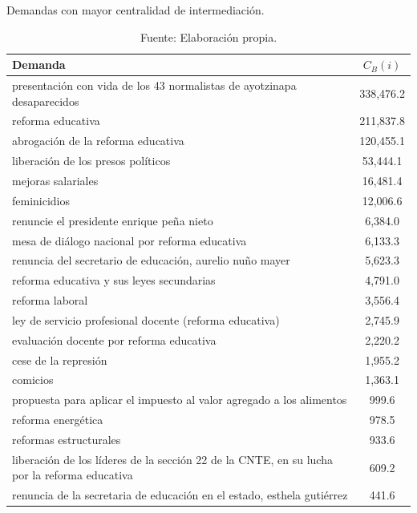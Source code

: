 \documentclass[letterpaper, 11pt]{book}
\theoremstyle{definition}
\theoremstyle{remark}
\begin{document}
\begin{table}[!hbt]
\center
\scriptsize
\caption{Demandas con mayor centralidad de intermediación.}
\label{Demandas_con_mayor_CB}
\begin{tabular}{ | l | c | } 
\hline
\hspace{19em} \textbf{Demanda} & \textbf{$C_{B}(i)$}\\
\hline
[a favor] presentación con vida de los 43 normalistas de ayotzinapa desaparecidos & 338,476.2\\ \hline
[en contra] reforma educativa & 211,837.8\\ \hline
[a favor] abrogación de la reforma educativa & 120,455.1\\ \hline
[a favor] liberación de los presos políticos & 53,444.1\\ \hline
[a favor] mejoras salariales & 16,481.4\\ \hline
[en contra] feminicidios & 12,006.6\\ \hline
[a favor] renuncie el presidente enrique peña nieto & 6,384.0\\ \hline
[a favor] mesa de diálogo nacional por reforma educativa & 6,133.3\\ \hline
[a favor] renuncia del secretario de educación, aurelio nuño mayer & 5,623.3\\ \hline
[en contra] reforma educativa y sus leyes secundarias & 4,791.0\\ \hline
[en contra] reforma laboral & 3,556.4\\ \hline
[en contra] ley de servicio profesional docente (reforma educativa) & 2,745.9\\ \hline
[en contra] evaluación docente por reforma educativa & 2,220.2\\ \hline
[a favor] cese de la represión & 1,955.2\\ \hline
[en contra] comicios & 1,363.1\\ \hline
[en contra] propuesta para aplicar el impuesto al valor agregado a los alimentos & 999.6\\ \hline
[en contra] reforma energética & 978.5\\ \hline
[en contra] reformas estructurales & 933.6\\ \hline
[a favor] liberación de los líderes de la sección 22 de la CNTE, en su lucha por la reforma educativa & 609.2\\ \hline
[a favor] renuncia de la secretaria de educación en el estado, esthela gutiérrez & 441.6\\ \hline
\end{tabular}
\par\bigskip
\caption*{\small Fuente: Elaboración propia.}
\end{table}
\end{document}
